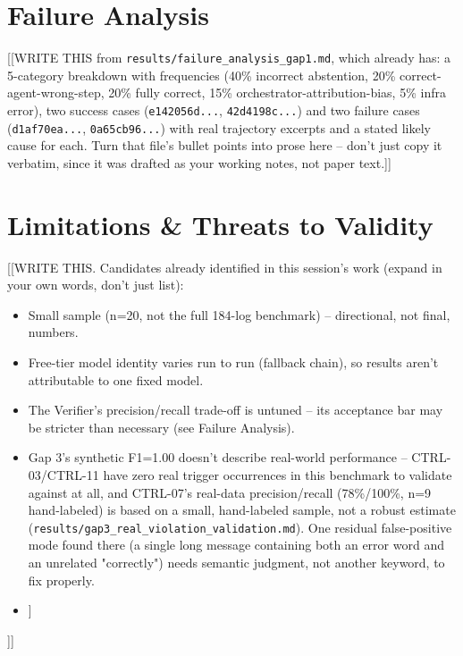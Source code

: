 \documentclass[conference]{IEEEtran}
\begin{document}
\section{Failure Analysis}
[[WRITE THIS from \texttt{results/failure\_analysis\_gap1.md}, which
already has: a 5-category breakdown with frequencies (40\% incorrect
abstention, 20\% correct-agent-wrong-step, 20\% fully correct, 15\%
orchestrator-attribution-bias, 5\% infra error), two success cases
(\texttt{e142056d...}, \texttt{42d4198c...}) and two failure cases
(\texttt{d1af70ea...}, \texttt{0a65cb96...}) with real trajectory excerpts
and a stated likely cause for each. Turn that file's bullet points into
prose here -- don't just copy it verbatim, since it was drafted as your
working notes, not paper text.]]

\section{Limitations \& Threats to Validity}
\label{sec:limitations}
[[WRITE THIS. Candidates already identified in this session's work (expand
in your own words, don't just list):
\begin{itemize}
  \item Small sample (n=20, not the full 184-log benchmark) -- directional,
    not final, numbers.
  \item Free-tier model identity varies run to run (fallback chain), so
    results aren't attributable to one fixed model.
  \item The Verifier's precision/recall trade-off is untuned -- its
    acceptance bar may be stricter than necessary (see Failure Analysis).
  \item Gap 3's synthetic F1=1.00 doesn't describe real-world performance --
    CTRL-03/CTRL-11 have zero real trigger occurrences in this benchmark to
    validate against at all, and CTRL-07's real-data precision/recall
    (78\%/100\%, n=9 hand-labeled) is based on a small, hand-labeled sample,
    not a robust estimate (\texttt{results/gap3\_real\_violation\_validation.md}).
    One residual false-positive mode found there (a single long message
    containing both an error word and an unrelated "correctly") needs
    semantic judgment, not another keyword, to fix properly.
  \item [[Areej: your Gap 2 threats -- e.g. synthetic vs. real tamper
    patterns, provenance graph completeness.]]
\end{itemize}
]]
\end{document}
